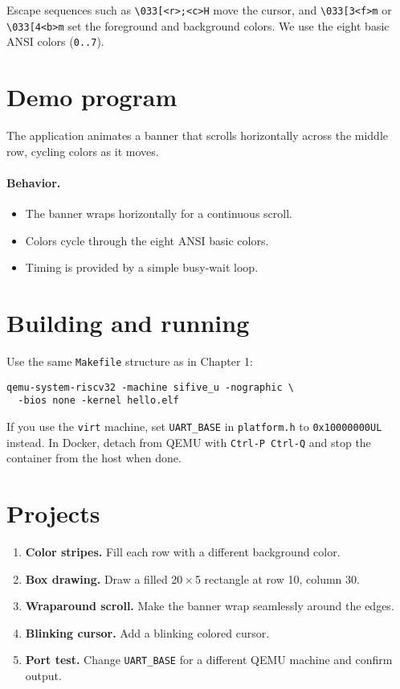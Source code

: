 \noindent
Escape sequences such as \verb|\033[<r>;<c>H| move the cursor,
and \verb|\033[3<f>m| or \verb|\033[4<b>m| set the foreground and background colors.
We use the eight basic ANSI colors (\texttt{0..7}).

\section*{Demo program}

The application animates a banner that scrolls horizontally across the middle row, cycling colors as it moves.

\begin{figure}[htb]
\centering

\end{figure}

\paragraph{Behavior.}
\begin{itemize}
  \item The banner wraps horizontally for a continuous scroll.
  \item Colors cycle through the eight ANSI basic colors.
  \item Timing is provided by a simple busy-wait loop.
\end{itemize}

\section*{Building and running}

Use the same \texttt{Makefile} structure as in Chapter 1:

\begin{verbatim}
qemu-system-riscv32 -machine sifive_u -nographic \
  -bios none -kernel hello.elf
\end{verbatim}

If you use the \texttt{virt} machine, set \texttt{UART\_BASE} in \texttt{platform.h}
to \texttt{0x10000000UL} instead.  
In Docker, detach from QEMU with \texttt{Ctrl-P Ctrl-Q} and stop the container from the host when done.

\section*{Projects}

\begin{enumerate}
  \item \textbf{Color stripes.} Fill each row with a different background color.
  \item \textbf{Box drawing.} Draw a filled 20\,$\times$\,5 rectangle at row 10, column 30.
  \item \textbf{Wraparound scroll.} Make the banner wrap seamlessly around the edges.
  \item \textbf{Blinking cursor.} Add a blinking colored cursor.
  \item \textbf{Port test.} Change \texttt{UART\_BASE} for a different QEMU machine and confirm output.
\end{enumerate}
